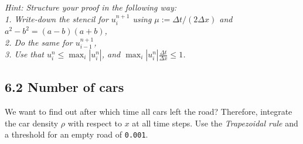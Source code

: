 \documentclass[a4paper,10pt]{article}
\begin{document}
\textit{Hint: Structure your proof in the following way:\\
       \phantom{\indent Hint: }1. Write-down the stencil for $u_i^{n+1}$ using $\mu:=\Delta t/(2 \Delta x)$ and $a^2-b^2 = (a-b)(a+b)$,\\
       \phantom{\indent Hint: }2. Do the same for $u_{i-1}^{n+1}$,\\
       \phantom{\indent Hint: }3. Use that $u_i^n \leq \max_i |u_i^n|$, and $\max_i |u_i^n| \frac{\Delta t}{\Delta x} \leq 1$.}

\subsection*{6.2 Number of cars}
We want to find out after which time all cars left the road? Therefore, integrate the car density $\rho$ with respect to $x$ at all time steps. Use the \textit{Trapezoidal rule} and a threshold for an empty road of \texttt{0.001}.
\end{document}
